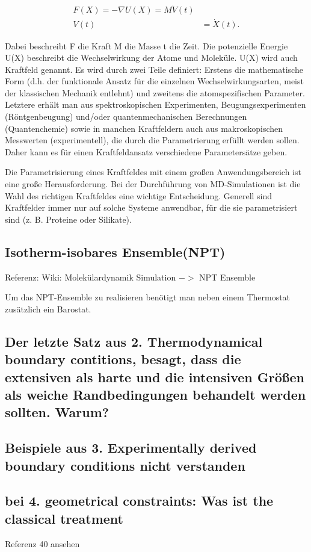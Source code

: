 \documentclass[]{article}
\begin{document}
\begin{align} F(X) = - \nabla U(X) = M \dot{V}(t) &\\ V(t) & = \dot{X}(t). \end{align}

Dabei beschreibt F die Kraft M die Masse
t die Zeit. Die potenzielle Energie U(X) beschreibt die Wechselwirkung der Atome und Moleküle. U(X) wird auch Kraftfeld genannt. Es wird durch zwei Teile definiert:
Erstens die mathematische Form (d.h. der funktionale Ansatz für die einzelnen Wechselwirkungsarten, meist der klassischen Mechanik entlehnt) und zweitens die atomspezifischen Parameter. Letztere erhält man aus spektroskopischen Experimenten, Beugungsexperimenten (Röntgenbeugung) und/oder quantenmechanischen Berechnungen (Quantenchemie) sowie in manchen Kraftfeldern auch aus makroskopischen Messwerten (experimentell), die durch die Parametrierung erfüllt werden sollen. Daher kann es für einen Kraftfeldansatz verschiedene Parametersätze geben.

Die Parametrisierung eines Kraftfeldes mit einem großen Anwendungsbereich ist eine große Herausforderung. Bei der Durchführung von MD-Simulationen ist die Wahl des richtigen Kraftfeldes eine wichtige Entscheidung. Generell sind Kraftfelder immer nur auf solche Systeme anwendbar, für die sie parametrisiert sind (z. B. Proteine oder Silikate).

\subsection{Isotherm-isobares Ensemble(NPT)}
Referenz: Wiki: Molekülardynamik Simulation $->$ NPT Ensemble

Um das NPT-Ensemble zu realisieren benötigt man neben einem Thermostat zusätzlich ein Barostat.

\subsection{Der letzte Satz aus 2. Thermodynamical boundary contitions, besagt, dass die extensiven als harte und die intensiven Größen als weiche Randbedingungen behandelt werden sollten. Warum?}

\subsection{Beispiele aus 3. Experimentally derived boundary conditions nicht verstanden}

\subsection{bei 4. geometrical constraints: Was ist \glqq the classical treatment \grqq}
Referenz 40 ansehen
\end{document}
